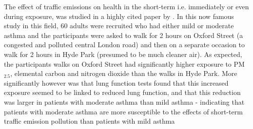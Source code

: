 The effect of traffic emissions on health in the short-term i.e. immediately or even during exposure, was studied in a highly cited paper by \cite{McCreanor2007}. In this now famous study in this field, 60 adults were recruited who had either mild or moderate asthma and the participants were asked to walk for 2 hours on Oxford Street (a congested and polluted central London road) and then on a separate occasion to walk for 2 hours in Hyde Park (presumed to be much cleaner air). As expected, the participants walks on Oxford Street had significantly higher exposure to PM$_{2.5}$, elemental carbon and nitrogen dioxide than the walks in Hyde Park. More significantly however was that lung function tests found that this increased exposure seemed to be linked to reduced lung function, and that this reduction was larger in patients with moderate asthma than mild asthma - indicating that patients with moderate asthma are more susceptible to the effects of short-term traffic emission pollution than patients with mild asthma 